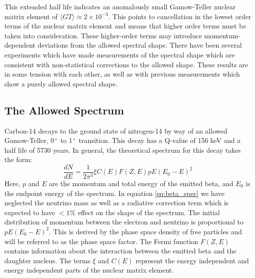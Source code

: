 This extended half life indicates an anomalously small Gamow-Teller nuclear matrix element of $\langle GT \rangle \approx 2 \times 10^{-3}$. This points to cancellation in the lowest order terms of the nuclear matrix element and means that higher order terms must be taken into consideration. These higher-order terms may introduce momentum-dependent deviations from the allowed spectral shape. There have been several experiments\cite{C14_Sonntag, C14_Wietfeldt, C14_Borexino, C14_Kuzminov, C14_Bergeron} which have made measurements of the spectral shape which are consistent with non-statistical corrections to the allowed shape. These results are in some tension with each other, as well as with previous measurements which show a purely allowed spectral shape\cite{C14_Curran}. 

\subsection{The Allowed Spectrum}
Carbon-14 decays to the ground state of nitrogen-14 by way of an allowed Gamow-Teller, 0$^+$ to 1$^+$ transition. This decay has a Q-value of 156 keV and a half life of 5730 years. In general, the theoretical spectrum for this decay takes the form\cite{C14_Kuzminov}:
\begin{equation}\label{eq:beta_spec}
\frac{dN}{dE}=\frac{1}{2\pi^3} \xi C(E) F(Z,E) pE(E_0-E)^2
\end{equation}
Here, $p$ and $E$ are the momentum and total energy of the emitted beta, and $E_0$ is the endpoint energy of the spectrum. In equation \ref{eq:beta_spec} we have neglected the neutrino mass as well as a radiative correction term which is expected to have $<1\%$ effect on the shape of the spectrum\cite{C14_Wietfeldt}. The initial distribution of momentum between the electron and neutrino is proportional to $pE(E_0-E)^2$. This is derived by the phase space density of free particles and will be referred to as the phase space factor. The Fermi function $F(Z,E)$ contains information about the interaction between the emitted beta and the daughter nucleus. The terms $\xi$ and  $C(E)$ represent the energy independent and energy independent parts of the nuclear matrix element.

